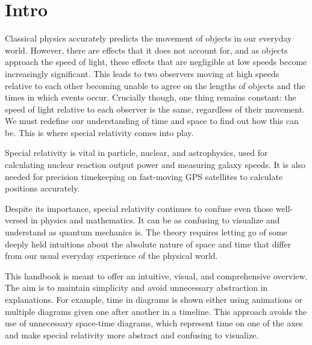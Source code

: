 \frontmatter
\chapter{Intro}

Classical physics accurately predicts the movement of objects in our everyday world. However, there are effects that it does not account for, and as objects approach the speed of light, these effects that are negligible at low speeds become increasingly significant. This leads to two observers moving at high speeds relative to each other becoming unable to agree on the lengths of objects and the times in which events occur. Crucially though, one thing remains constant: the speed of light relative to each observer is the same, regardless of their movement. We must redefine our understanding of time and space to find out how this can be. This is where special relativity comes into play.

Special relativity is vital in particle, nuclear, and astrophysics, used for calculating nuclear reaction output power and measuring galaxy speeds. It is also needed for precision timekeeping on fast-moving GPS satellites to calculate positions accurately.


Despite its importance, special relativity continues to confuse even those well-versed in physics and mathematics. It can be as confusing to visualize and understand as quantum mechanics is. The theory requires letting go of some deeply held intuitions about the absolute nature of space and time that differ from our usual everyday experience of the physical world.

This handbook is meant to offer an intuitive, visual, and comprehensive overview. The aim is to maintain simplicity and avoid unnecessary abstraction in explanations. For example, time in diagrams is shown either using animations or multiple diagrams given one after another in a timeline. This approach avoids the use of unnecessary space-time diagrams, which represent time on one of the axes and make special relativity more abstract and confusing to visualize.

